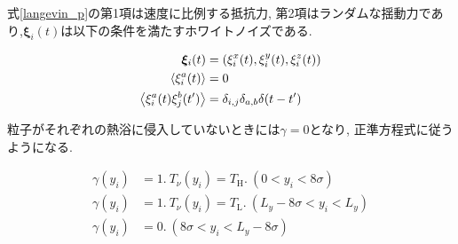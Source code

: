式\eqref{langevin_p}の第1項は速度に比例する抵抗力, 第2項はランダムな揺動力であり,$\bm{\xi}_{i}(t)$は以下の条件を満たすホワイトノイズである.

\begin{align}
  \bm{\xi}_{i}(t) &= ({\xi_{i}^{x}(t)}, {\xi_{i}^{y}(t)}, {\xi_{i}^{z}(t)}) \\
  \expval{\xi_{i}^{a}(t)} &= 0 \\
  \expval{\xi_{i}^{a}(t)\xi_{j}^{b}(t')} &= \delta_{i,j} \delta_{a,b}\delta (t-t')
\end{align}

粒子がそれぞれの熱浴に侵入していないときには$\gamma=0$となり, 正準方程式に従うようになる. 

\begin{align}
  \gamma(y_i) &= 1. \ T_{\nu}(y_i) = T_{\text{H}}. \ (0 < y_i < 8\sigma) \\
  \gamma(y_i) &= 1. \ T_{\nu}(y_i) = T_{\text{L}}. \ (L_y - 8\sigma < y_i < L_y) \\
  \gamma(y_i) &= 0.  \ (8\sigma < y_i < L_y - 8\sigma)
\end{align}
